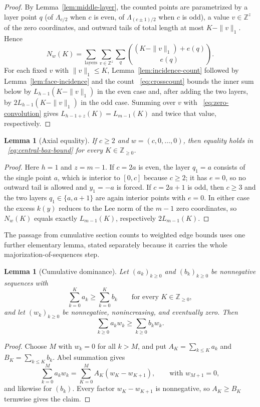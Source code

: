\documentclass[pdflatex,sn-mathphys-num]{sn-jnl}
\theoremstyle{thmstyleone}
\newtheorem{lemma}[theorem]{Lemma}
\theoremstyle{thmstylethree}
\theoremstyle{thmstyletwo}
\newcommand{\Z}{\mathbb Z}
\begin{document}
\begin{proof}
By Lemma~\ref{lem:middle-layer}, the counted points are parametrized by a
layer point $q$ (of $\Lambda_{c/2}$ when $c$ is even, of $\Lambda_{(c\pm1)/2}$
when $c$ is odd), a value $v\in\Z^z$ of the zero coordinates, and outward
tails of total length at most $K-\|v\|_1$.  Hence
\[
 N_w(K)
 =\sum_{\text{layers}}\sum_{v\in\Z^z}\sum_{q}
  \binom{(K-\|v\|_1)+e(q)}{e(q)}.
\]
For each fixed $v$ with $\|v\|_1\le K$, Lemma~\ref{lem:incidence-count}
followed by Lemma~\ref{lem:face-incidence} and the count
~\eqref{eq:crosscount} bounds the inner sum below by
$L_{h-1}(K-\|v\|_1)$ in the even case and, after adding the two layers, by
$2L_{h-1}(K-\|v\|_1)$ in the odd case.  Summing over $v$ with
~\eqref{eq:zero-convolution} gives $L_{h-1+z}(K)=L_{m-1}(K)$ and twice that
value, respectively.
\end{proof}

\begin{lemma}[Axial equality]
\label{lem:axial-equality}
If $c\ge2$ and $w=(c,0,\ldots,0)$, then equality holds in
~\eqref{eq:central-box-bound} for every $K\in\Z_{\ge0}$.
\end{lemma}

\begin{proof}
Here $h=1$ and $z=m-1$.  If $c=2a$ is even, the layer $q_1=a$ consists of
the single point $a$, which is interior to $[0,c]$ because $c\ge2$; it has
$e=0$, so no outward tail is allowed and $y_1=-a$ is forced.  If $c=2a+1$
is odd, then $c\ge3$ and the two layers $q_1\in\{a,a+1\}$ are again interior
points with $e=0$.  In either case the excess $k(y)$ reduces to the Lee norm
of the $m-1$ zero coordinates, so $N_w(K)$ equals exactly $L_{m-1}(K)$,
respectively $2L_{m-1}(K)$.
\end{proof}

The passage from cumulative section counts to weighted edge bounds uses one
further elementary lemma, stated separately because it carries the whole
majorization-of-sequences step.

\begin{lemma}[Cumulative dominance]
\label{lem:cumulative-dominance}
Let $(a_k)_{k\ge0}$ and $(b_k)_{k\ge0}$ be nonnegative sequences with
\[
 \sum_{k=0}^K a_k\ge\sum_{k=0}^K b_k
 \qquad\text{for every }K\in\Z_{\ge0},
\]
and let $(w_k)_{k\ge0}$ be nonnegative, nonincreasing, and eventually zero.
Then
\[
 \sum_{k\ge0}a_kw_k\ge\sum_{k\ge0}b_kw_k.
\]
\end{lemma}

\begin{proof}
Choose $M$ with $w_k=0$ for all $k>M$, and put $A_K=\sum_{k\le K}a_k$ and
$B_K=\sum_{k\le K}b_k$.  Abel summation gives
\[
 \sum_{k=0}^M a_kw_k=\sum_{K=0}^M A_K(w_K-w_{K+1}),
 \qquad\text{with }w_{M+1}=0,
\]
and likewise for $(b_k)$.  Every factor $w_K-w_{K+1}$ is nonnegative, so
$A_K\ge B_K$ termwise gives the claim.
\end{proof}
\end{document}
